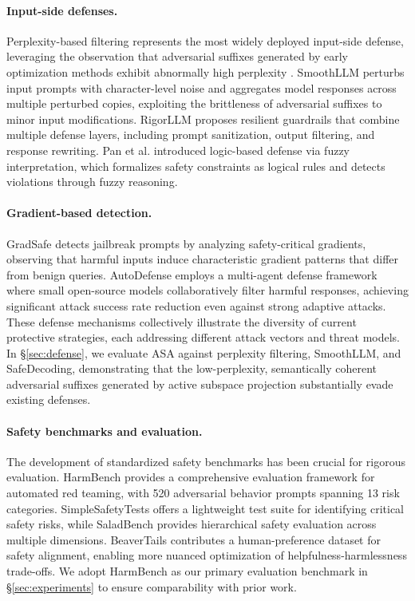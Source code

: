 ﻿\documentclass[lettersize,journal]{IEEEtran}
\begin{document}
\paragraph{Input-side defenses.} Perplexity-based filtering represents the most widely deployed input-side defense, leveraging the observation that adversarial suffixes generated by early optimization methods exhibit abnormally high perplexity \cite{zhu2023autodan}. SmoothLLM \cite{robey2023smoothllm} perturbs input prompts with character-level noise and aggregates model responses across multiple perturbed copies, exploiting the brittleness of adversarial suffixes to minor input modifications. RigorLLM \cite{yuan2024rigorllm} proposes resilient guardrails that combine multiple defense layers, including prompt sanitization, output filtering, and response rewriting. Pan et al. \cite{pan2024logic} introduced logic-based defense via fuzzy interpretation, which formalizes safety constraints as logical rules and detects violations through fuzzy reasoning.

\paragraph{Gradient-based detection.} GradSafe \cite{xie2024gradsafe} detects jailbreak prompts by analyzing safety-critical gradients, observing that harmful inputs induce characteristic gradient patterns that differ from benign queries. AutoDefense \cite{zeng2024autodefense} employs a multi-agent defense framework where small open-source models collaboratively filter harmful responses, achieving significant attack success rate reduction even against strong adaptive attacks. These defense mechanisms collectively illustrate the diversity of current protective strategies, each addressing different attack vectors and threat models. In \S\ref{sec:defense}, we evaluate ASA against perplexity filtering, SmoothLLM, and SafeDecoding, demonstrating that the low-perplexity, semantically coherent adversarial suffixes generated by active subspace projection substantially evade existing defenses.

\paragraph{Safety benchmarks and evaluation.} The development of standardized safety benchmarks has been crucial for rigorous evaluation. HarmBench \cite{mazeika2024harmbench} provides a comprehensive evaluation framework for automated red teaming, with 520 adversarial behavior prompts spanning 13 risk categories. SimpleSafetyTests \cite{vidgen2023simple} offers a lightweight test suite for identifying critical safety risks, while SaladBench \cite{li2024saladbench} provides hierarchical safety evaluation across multiple dimensions. BeaverTails \cite{ji2023beavertails} contributes a human-preference dataset for safety alignment, enabling more nuanced optimization of helpfulness-harmlessness trade-offs. We adopt HarmBench as our primary evaluation benchmark in \S\ref{sec:experiments} to ensure comparability with prior work.
\end{document}
